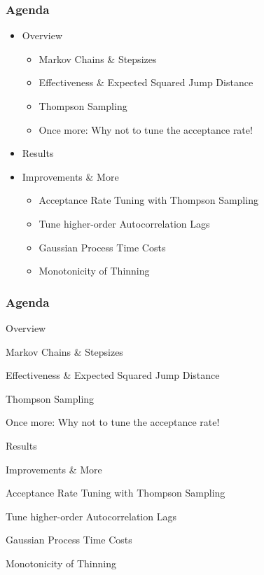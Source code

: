 \begin{frame}[c]
    \frametitle{Agenda}
    \begin{itemize}
        \item Overview
        \begin{itemize}
            \item Markov Chains \& Stepsizes
            \item Effectiveness \& Expected Squared Jump Distance 
            \item Thompson Sampling
            \item Once more: Why not to tune the acceptance rate!
        \end{itemize}
        \item Results
        \item Improvements \& More
        \begin{itemize}
            \item Acceptance Rate Tuning with Thompson Sampling
            \item Tune higher-order Autocorrelation Lags
            \item Gaussian Process Time Costs
            \item Monotonicity of Thinning
        \end{itemize}
    \end{itemize}
\end{frame}

\begin{frame}[c]
    \frametitle{Agenda}
    \begin{itemize}
        \item Overview
        \begin{itemize}
            \item Markov Chains \& Stepsizes
            {\color{lgray}
            \item Effectiveness \& Expected Squared Jump Distance 
            \item Thompson Sampling
            \item Once more: Why not to tune the acceptance rate!
            }
        \end{itemize}
        {\color{lgray}
        \item Results
        \item Improvements \& More
        }
        \begin{itemize}
            {\color{lgray}
            \item Acceptance Rate Tuning with Thompson Sampling
            \item Tune higher-order Autocorrelation Lags
            \item Gaussian Process Time Costs
            \item Monotonicity of Thinning
        }
        \end{itemize}
    \end{itemize}
\end{frame}

